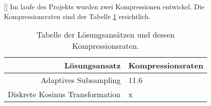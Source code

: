 [\baselineskip]
Im laufe des Projekts wurden zwei Kompressionen entwickel. Die Kompressionsraten sind der Tabelle \ref{einleitung:tabelle} ersichtlich.
\begin{table}[!htbp]
	\center
	\begin{tabular}{r|l}
		Lösungsansatz & Kompressionsraten \\\hline
		Adaptives Subsampling & 11.6 \\
		Diskrete Kosinus Transformation & x \\
	\end{tabular}
	\caption{Tabelle der Lösungsansätzen und dessen Kompressionsraten.}
	\label{einleitung:tabelle}
\end{table}
